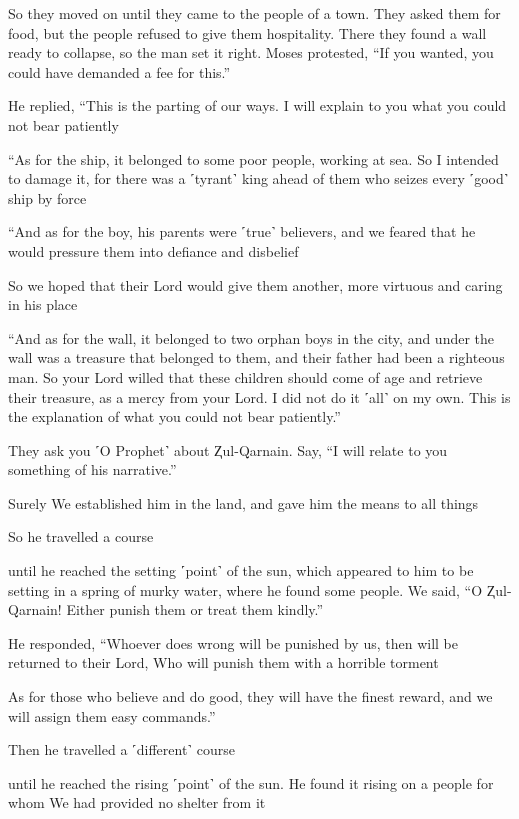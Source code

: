 So they moved on until they came to the people of a town. They asked them for food, but the people refused to give them hospitality. There they found a wall ready to collapse, so the man set it right. Moses protested, “If you wanted, you could have demanded a fee for this.”

He replied, “This is the parting of our ways. I will explain to you what you could not bear patiently

“As for the ship, it belonged to some poor people, working at sea. So I intended to damage it, for there was a ˹tyrant˺ king ahead of them who seizes every ˹good˺ ship by force

“And as for the boy, his parents were ˹true˺ believers, and we feared that he would pressure them into defiance and disbelief

So we hoped that their Lord would give them another, more virtuous and caring in his place

“And as for the wall, it belonged to two orphan boys in the city, and under the wall was a treasure that belonged to them, and their father had been a righteous man. So your Lord willed that these children should come of age and retrieve their treasure, as a mercy from your Lord. I did not do it ˹all˺ on my own. This is the explanation of what you could not bear patiently.”

They ask you ˹O Prophet˺ about Ⱬul-Qarnain. Say, “I will relate to you something of his narrative.”

Surely We established him in the land, and gave him the means to all things

So he travelled a course

until he reached the setting ˹point˺ of the sun, which appeared to him to be setting in a spring of murky water, where he found some people. We said, “O Ⱬul-Qarnain! Either punish them or treat them kindly.”

He responded, “Whoever does wrong will be punished by us, then will be returned to their Lord, Who will punish them with a horrible torment

As for those who believe and do good, they will have the finest reward, and we will assign them easy commands.”

Then he travelled a ˹different˺ course

until he reached the rising ˹point˺ of the sun. He found it rising on a people for whom We had provided no shelter from it

